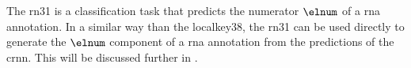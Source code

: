
The \gls{rn31} is a classification task that predicts the
numerator $\elnum$ of a \gls{rna} annotation. In a similar
way than the \gls{localkey38}, the \gls{rn31} can be used
directly to generate the $\elnum$ component of a \gls{rna}
annotation from the predictions of the \gls{crnn}. This will
be discussed further in .


